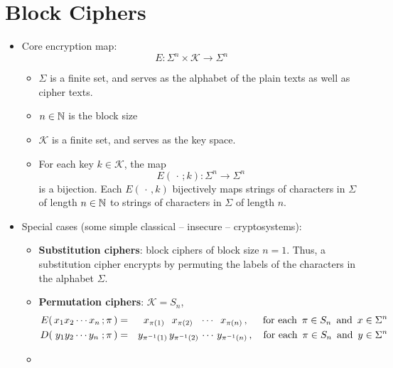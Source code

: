 
\section{Block Ciphers}
\setcounter{theorem}{0}
\setcounter{equation}{0}

\begin{itemize}
\item
	Core encryption map:
	\begin{equation*}
	E : \Sigma^{n} \times \mathcal{K} \longrightarrow \Sigma^{n}\,
	\end{equation*}
	\begin{itemize}
	\item
		$\Sigma$ is a finite set, and serves as the alphabet of the plain texts as well as cipher texts.
	\item
		$n \in \mathbb{N}$ is the block size
	\item
		$\mathcal{K}$ is a finite set, and serves as the key space.
	\item
		For each key $k \in \mathcal{K}$, the map
		\begin{equation*}
		E(\,\cdot\,;k) : \Sigma^{n} \longrightarrow \Sigma^{n}
		\end{equation*}
		is a bijection.
		Each $E(\,\cdot\,,k)$ bijectively maps strings of characters in $\Sigma$ of length $n \in \mathbb{N}$
		to strings of characters in $\Sigma$ of length $n$.
	\end{itemize}
\item
	Special cases (some simple classical -- insecure -- cryptosystems):
	\begin{itemize}
	\item
		\textbf{Substitution ciphers}: block ciphers of block size $n = 1$.
		Thus, a substitution cipher encrypts by permuting the labels of the characters in the alphabet $\Sigma$.
	\item
		\textbf{Permutation ciphers}: $\mathcal{K} = S_{n}$,
		\begin{eqnarray*}
		E\!\left(\,x_{1}x_{2} \cdots x_{n}\,;\pi\,\right)
		& = &
			\;\; x_{\pi(1)} \;\;\, x_{\pi(2)} \;\;\, \cdots \;\; x_{\pi(n)} \,,
		\quad\;\,
		\textnormal{for each \,$\pi \in S_{n}$\, and \,$x \in \Sigma^{n}$}
		\\
		D\!\left(\;y_{1}y_{2} \cdots y_{n}\;;\pi\,\right)
		& = &
			y_{\pi^{-1}(1)}\,y_{\pi^{-1}(2)} \, \cdots \, y_{\pi^{-1}(n)}\,,
		\quad
		\textnormal{for each \,$\pi \in S_{n}$\, and \,$y \in \Sigma^{n}$}
		\end{eqnarray*}
	\item

\end{itemize}
\end{itemize}
